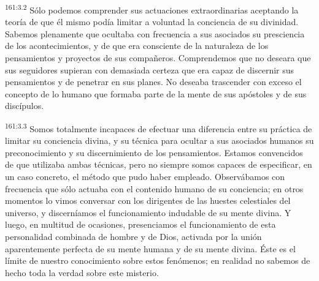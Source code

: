 \par
\textsuperscript{161:3.2} Sólo podemos comprender sus actuaciones extraordinarias aceptando la teoría de que él mismo podía limitar a voluntad la conciencia de su divinidad. Sabemos plenamente que ocultaba con frecuencia a sus asociados su presciencia de los acontecimientos, y de que era consciente de la naturaleza de los pensamientos y proyectos de sus compañeros. Comprendemos que no deseara que sus seguidores supieran con demasiada certeza que era capaz de discernir sus pensamientos y de penetrar en sus planes. No deseaba trascender con exceso el concepto de lo humano que formaba parte de la mente de sus apóstoles y de sus discípulos.

\par
\textsuperscript{161:3.3} Somos totalmente incapaces de efectuar una diferencia entre su práctica de limitar su conciencia divina, y su técnica para ocultar a sus asociados humanos su preconocimiento y su discernimiento de los pensamientos. Estamos convencidos de que utilizaba ambas técnicas, pero no siempre somos capaces de especificar, en un caso concreto, el método que pudo haber empleado. Observábamos con frecuencia que sólo actuaba con el contenido humano de su conciencia; en otros momentos lo vimos conversar con los dirigentes de las huestes celestiales del universo, y discerníamos el funcionamiento indudable de su mente divina. Y luego, en multitud de ocasiones, presenciamos el funcionamiento de esta personalidad combinada de hombre y de Dios, activada por la unión aparentemente perfecta de su mente humana y de su mente divina. Éste es el límite de nuestro conocimiento sobre estos fenómenos; en realidad no sabemos de hecho toda la verdad sobre este misterio.